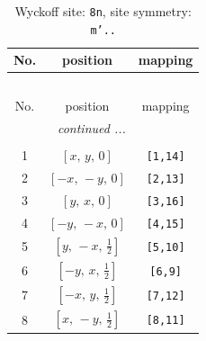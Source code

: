\documentclass[fleqn,8pt]{jsarticle}
\begin{document}
\begin{longtable}{ccc}
\caption{Wyckoff site: {\tt 8n}, site symmetry: {\tt m'..}}
 \\
 \hline \hline
No. & position & mapping \\ \hline \endfirsthead

\multicolumn{2}{l}{\tablename\ \thetable{}} \\
 \hline \hline
No. & position & mapping \\ \hline \endhead

 \hline \hline
\multicolumn{2}{r}{\footnotesize\it continued ...} \\ \endfoot

 \hline \hline
\multicolumn{2}{r}{} \\ \endlastfoot

1 & $\left[ x,\, y,\, 0 \right]$ & {\tt [1,14]} \\ \hline
2 & $\left[ - x,\, - y,\, 0 \right]$ & {\tt [2,13]} \\ \hline
3 & $\left[ y,\, x,\, 0 \right]$ & {\tt [3,16]} \\ \hline
4 & $\left[ - y,\, - x,\, 0 \right]$ & {\tt [4,15]} \\ \hline
5 & $\left[ y,\, - x,\, \frac{1}{2} \right]$ & {\tt [5,10]} \\ \hline
6 & $\left[ - y,\, x,\, \frac{1}{2} \right]$ & {\tt [6,9]} \\ \hline
7 & $\left[ - x,\, y,\, \frac{1}{2} \right]$ & {\tt [7,12]} \\ \hline
8 & $\left[ x,\, - y,\, \frac{1}{2} \right]$ & {\tt [8,11]} \\
\end{longtable}
\renewcommand{\arraystretch}{1.2}
\end{document}
